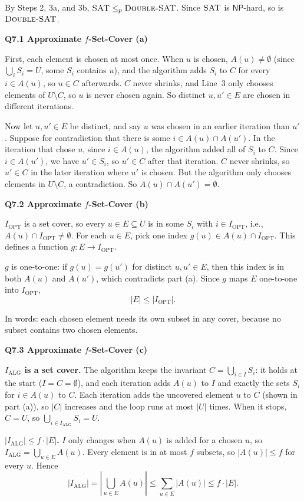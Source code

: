 \documentclass[11pt]{article}
\newcommand{\abs}[1]{\left|#1\right|}
\newcommand{\lp}{\leq_p}
\newcommand{\cproblem}[1]{\textsc{#1}}
\newcommand{\NP}{\textsf{NP}}
\newcommand{\SAT}{\cproblem{SAT}}
\newcommand{\DSAT}{\cproblem{Double-SAT}}
\newcommand{\OPT}{\mathrm{OPT}}
\newcommand{\ALG}{\mathrm{ALG}}
\newcommand{\qpage}[1]{\clearpage\noindent\textbf{\large #1}\par\medskip}
\begin{document}
By Steps 2, 3a, and 3b, $\SAT \lp \DSAT$.
Since $\SAT$ is $\NP$-hard, so is $\DSAT$.

\qpage{Q7.1 Approximate $f$-Set-Cover (a)}

First, each element is chosen at most once.
When $u$ is chosen, $A(u) \neq \emptyset$ (since $\bigcup_i S_i = U$, some $S_i$ contains $u$), and the algorithm adds $S_i$ to $C$ for every $i \in A(u)$, so $u \in C$ afterwards.
$C$ never shrinks, and Line~3 only chooses elements of $U \setminus C$, so $u$ is never chosen again.
So distinct $u, u' \in E$ are chosen in different iterations.

Now let $u, u' \in E$ be distinct, and say $u$ was chosen in an earlier iteration than $u'$.
Suppose for contradiction that there is some $i \in A(u) \cap A(u')$.
In the iteration that chose $u$, since $i \in A(u)$, the algorithm added all of $S_i$ to $C$.
Since $i \in A(u')$, we have $u' \in S_i$, so $u' \in C$ after that iteration.
$C$ never shrinks, so $u' \in C$ in the later iteration where $u'$ is chosen.
But the algorithm only chooses elements in $U \setminus C$, a contradiction.
So $A(u) \cap A(u') = \emptyset$.

\qpage{Q7.2 Approximate $f$-Set-Cover (b)}

$I_\OPT$ is a set cover, so every $u \in E \subseteq U$ is in some $S_i$ with $i \in I_\OPT$, i.e., $A(u) \cap I_\OPT \neq \emptyset$.
For each $u \in E$, pick one index $g(u) \in A(u) \cap I_\OPT$.
This defines a function $g : E \to I_\OPT$.

$g$ is one-to-one: if $g(u) = g(u')$ for distinct $u, u' \in E$, then this index is in both $A(u)$ and $A(u')$, which contradicts part (a).
Since $g$ maps $E$ one-to-one into $I_\OPT$,
\[
  \abs{E} \leq \abs{I_\OPT}.
\]

In words: each chosen element needs its own subset in any cover, because no subset contains two chosen elements.

\qpage{Q7.3 Approximate $f$-Set-Cover (c)}

\textbf{$I_\ALG$ is a set cover.}
The algorithm keeps the invariant $C = \bigcup_{i \in I} S_i$: it holds at the start ($I = C = \emptyset$), and each iteration adds $A(u)$ to $I$ and exactly the sets $S_i$ for $i \in A(u)$ to $C$.
Each iteration adds the uncovered element $u$ to $C$ (shown in part (a)), so $\abs{C}$ increases and the loop runs at most $\abs{U}$ times.
When it stops, $C = U$, so $\bigcup_{i \in I_\ALG} S_i = U$.

\textbf{$\abs{I_\ALG} \leq f \cdot \abs{E}$.}
$I$ only changes when $A(u)$ is added for a chosen $u$, so $I_\ALG = \bigcup_{u \in E} A(u)$.
Every element is in at most $f$ subsets, so $\abs{A(u)} \leq f$ for every $u$.
Hence
\[
  \abs{I_\ALG} = \abs{\bigcup_{u \in E} A(u)} \leq \sum_{u \in E} \abs{A(u)} \leq f \cdot \abs{E}.
\]
\end{document}
